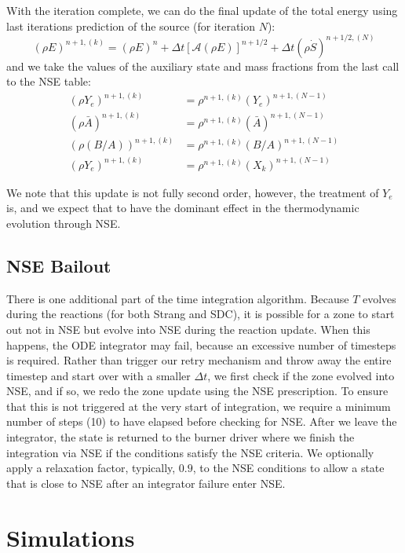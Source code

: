\documentclass[times,modern]{aastex63}
\newcommand{\Sdot}{\dot{S}}
\newcommand{\Advss}[1]{{\left [{\mathcal{{A}}} \left(#1\right)\right]}}
\begin{document}
With the iteration complete, we can do the final update of the total energy using last iterations prediction of the source (for iteration $N$):
\begin{equation}
(\rho E)^{n+1,(k)} = (\rho E)^n + \Delta t \Advss{\rho E}^{n+1/2} + \Delta t (\rho \Sdot)^{n+1/2,(N)}
\end{equation}
and we take the values of the auxiliary state and mass fractions from the last call to the NSE table:
\begin{align}
(\rho Y_e)^{n+1,(k)} &= \rho^{n+1,(k)} (Y_e)^{n+1,(N-1)} \\
(\rho \bar{A})^{n+1,(k)} &= \rho^{n+1,(k)} (\bar{A})^{n+1,(N-1)} \\
(\rho (B/A))^{n+1,(k)} &= \rho^{n+1,(k)} (B/A)^{n+1,(N-1)} \\
(\rho Y_e)^{n+1,(k)} &= \rho^{n+1,(k)} (X_k)^{n+1,(N-1)}
\end{align}

We note that this update is not fully second order, however, the
treatment of $Y_e$ is, and we expect that to have the dominant effect
in the thermodynamic evolution through NSE.

\subsection{NSE Bailout}

There is one additional part of the time integration algorithm.
Because $T$ evolves during the reactions (for both Strang and SDC), it
is possible for a zone to start out not in NSE but evolve into NSE
during the reaction update.  When this happens, the ODE integrator may
fail, because an excessive number of timesteps is required.  Rather
than trigger our retry mechanism and throw away the entire timestep
and start over with a smaller $\Delta t$, we first check if the zone
evolved into NSE, and if so, we redo the zone update using the NSE
prescription.  To ensure that this is not triggered at the very start
of integration, we require a minimum number of steps (10) to have
elapsed before checking for NSE.  After we leave the integrator, the
state is returned to the burner driver where we finish the integration
via NSE if the conditions satisfy the NSE criteria.  We optionally
apply a relaxation factor, typically, $0.9$, to the NSE conditions to
allow a state that is close to NSE after an integrator failure enter
NSE.

\section{Simulations}
\end{document}
